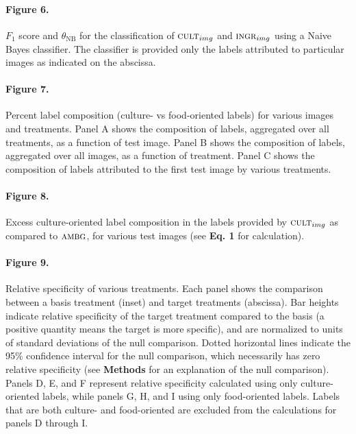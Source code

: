 \documentclass[a4paper]{report}
\begin{document}
\paragraph{Figure 6.}
$F_1$ score and $\theta_\text{NB}$ for the classification of 
$\textsc{cult}_{img}$ and $\textsc{ingr}_{img}$ using a Naive Bayes 
classifier.  The classifier is provided only the labels attributed to
particular images as indicated on the abscissa.

\paragraph{Figure 7.}
Percent label composition (culture- vs food-oriented labels) for 
various images and treatments.  Panel A shows the composition of 
labels, aggregated over all treatments, as a function of test image.
Panel B shows the composition of labels, aggregated over all images, as
a function of treatment.  Panel C shows the composition of labels 
attributed to the first test image by various treatments.

\paragraph{Figure 8.}
Excess culture-oriented label composition in the labels provided
by $\textsc{cult}_{img}$ as compared to $\textsc{ambg}$, for various
test images (see \textbf{Eq. 1} for calculation).

\paragraph{Figure 9.}
Relative specificity of various treatments.
Each panel shows the comparison between a basis treatment (inset) and 
target treatments (abscissa).
Bar heights indicate relative specificity of the target 
treatment compared to the basis (a positive quantity means the target 
is more specific), and are normalized to units of standard 
deviations of the null comparison.  Dotted horizontal lines indicate
the 95\% confidence interval for the null comparison, which necessarily
has zero relative specificity (see \textbf{Methods} 
for an explanation of the null comparison).  Panels D, E, and F 
represent relative specificity calculated using only culture-oriented
labels, while panels G, H, and I using only food-oriented labels.
Labels that are both culture- and food-oriented are excluded from the
calculations for panels D through I.
\end{document}
